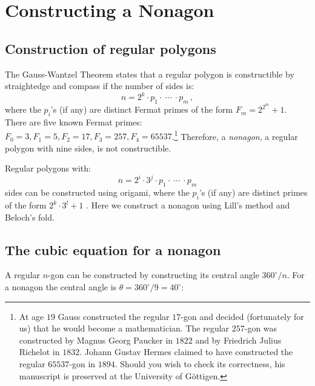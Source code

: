 
\chapter{Constructing a Nonagon}\label{c.nonagon}

\section{Construction of regular polygons}

The Gauss-Wantzel Theorem states that a regular polygon is constructible by straightedge and compass if the number of sides is:
\[
n=2^k\cdot p_1 \cdot \:\cdots\: \cdot p_m\,,
\]
where the $p_i$'s (if any) are distinct Fermat primes of the form $F_m=2^{2^m}+1$. There are five known Fermat primes: $F_0=3, F_1=5, F_2=17, F_3=257, F_4=65537$.\footnote{At age $19$ Gauss constructed the regular $17$-gon and decided (fortunately for us) that he would 	become a mathematician. The regular $257$-gon was constructed by Magnus Georg Paucker in $1822$ and by Friedrich Julius Richelot in $1832$. Johann Gustav Hermes claimed to have constructed the regular $65537$-gon in $1894$. Should you wish to check its correctness, his manuscript is preserved at the University of G\"{o}ttigen.} Therefore, a \emph{nonagon}, a regular polygon with nine sides, is not constructible.

Regular polygons with:
\[
n=2^i\cdot 3^j \cdot p_1 \cdot \: \cdots\: \cdot p_m
\]
sides can be constructed using origami, where the $p_i$'s (if any) are distinct primes of the form $2^k\cdot 3^l+1$ \cite{alperin}. Here we construct a nonagon using Lill's method and Beloch's fold.

\section{The cubic equation for a nonagon}

A regular $n$-gon can be constructed by constructing its central angle $360^\circ/n$. For a nonagon the central angle is $\theta=360^\circ/9=40^\circ$:
\begin{center}
\end{center}

